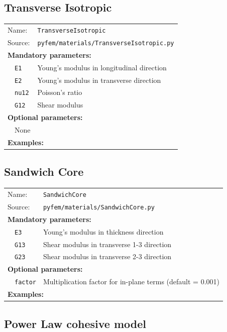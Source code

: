 \documentclass{article}
\begin{document}
\subsection{Transverse Isotropic}

\begin{tabular}{p{22mm}p{74mm}}
Name:         & \texttt{TransverseIsotropic} \\
Source:  & \texttt{pyfem/materials/TransverseIsotropic.py} \\
\multicolumn{2}{l}{\textbf{Mandatory parameters:}} \\
~~\texttt{E1}   & Young's modulus in longitudinal direction \\
~~\texttt{E2}   & Young's modulus in transverse direction \\
~~\texttt{nu12} & Poisson's ratio \\
~~\texttt{G12}  & Shear modulus \\
\multicolumn{2}{l}{\textbf{Optional parameters:}} \\ 
~~None  & \\
\multicolumn{2}{l}{\textbf{Examples:}}
\end{tabular}

\subsection{Sandwich Core}

\begin{tabular}{p{22mm}p{74mm}}
Name:         & \texttt{SandwichCore} \\
Source:  & \texttt{pyfem/materials/SandwichCore.py} \\
\multicolumn{2}{l}{\textbf{Mandatory parameters:}} \\
~~\texttt{E3}   & Young's modulus in thickness direction \\
~~\texttt{G13}  & Shear modulus in transverse 1-3 direction \\
~~\texttt{G23}  & Shear modulus in transverse 2-3 direction \\
\multicolumn{2}{l}{\textbf{Optional parameters:}} \\ 
~~\texttt{factor} & Multiplication factor for in-plane terms (default = 0.001)\\
\multicolumn{2}{l}{\textbf{Examples:}}
\end{tabular}

\subsection{Power Law cohesive model}
\end{document}
